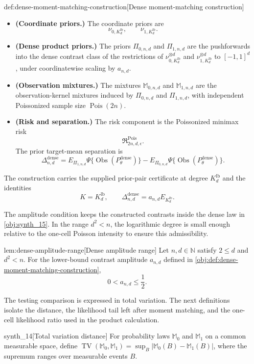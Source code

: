 \begin{definitionv}{def:dense-moment-matching-construction}[Dense moment-matching construction]
\begin{itemize}
\[
\lambda_{n,d}=\frac{2n}{d},
\qquad
a_{n,d}=\sqrt{\frac{K_d^{\mathrm{lb}}}{64\lambda_{n,d}}}.
\]
\item \textbf{(Coordinate priors.)} The coordinate priors are
\[
\nu_{0,K_d^{\mathrm{lb}}},
\qquad
\nu_{1,K_d^{\mathrm{lb}}}.
\]
\item \textbf{(Dense product priors.)} The priors \(\Pi_{0,n,d}\) and \(\Pi_{1,n,d}\) are the pushforwards into the dense contrast class of the restrictions of \(\nu_{0,K_d^{\mathrm{lb}}}^{\otimes d}\) and \(\nu_{1,K_d^{\mathrm{lb}}}^{\otimes d}\) to \([-1,1]^d\), under coordinatewise scaling by \(a_{n,d}\).
\item \textbf{(Observation mixtures.)} The mixtures \(\mathbb M_{0,n,d}\) and \(\mathbb M_{1,n,d}\) are the observation-kernel mixtures induced by \(\Pi_{0,n,d}\) and \(\Pi_{1,n,d}\), with independent Poissonized sample size \(\operatorname{Pois}(2n)\).
\item \textbf{(Risk and separation.)} The risk component is the Poissonized minimax risk
\[
\mathfrak R^{\mathrm{Pois}}_{2n,d,\epsilon}.
\]
The prior target-mean separation is
\[
\Delta_{n,d}^{\mathrm{dense}}
=
E_{\Pi_{1,n,d}}\Psi\{\operatorname{Obs}(P_\theta^{\mathrm{dense}})\}
-
E_{\Pi_{0,n,d}}\Psi\{\operatorname{Obs}(P_\theta^{\mathrm{dense}})\}.
\]
\end{itemize}
The construction carries the supplied prior-pair certificate at degree \(K_d^{\mathrm{lb}}\) and the identities
\[
K=K_d^{\mathrm{lb}},
\qquad
\Delta_{n,d}^{\mathrm{dense}}
=
a_{n,d}E_{K_d^{\mathrm{lb}}}.
\]
\end{definitionv}

The amplitude condition keeps the constructed contrasts inside the dense law in \cref{obj:synth_15}. In the range \(d^2<n\), the logarithmic degree is small enough relative to the one-cell Poisson intensity to ensure this admissibility.

\begin{lemmav}{lem:dense-amplitude-range}[Dense amplitude range]
Let \(n,d\in\mathbb N\) satisfy \(2\le d\) and \(d^2<n\). For the lower-bound contrast amplitude \(a_{n,d}\) defined in \cref{obj:def:dense-moment-matching-construction},
\[
0<a_{n,d}\le \frac12.
\]
\end{lemmav}

The testing comparison is expressed in total variation. The next definitions isolate the distance, the likelihood tail left after moment matching, and the one-cell likelihood ratio used in the product calculation.

\begin{definitionv}{synth_14}[Total variation distance]
For probability laws \(\mathbb M_0\) and \(\mathbb M_1\) on a common measurable space, define \(\operatorname{TV}(\mathbb M_0,\mathbb M_1)=\sup_{B}\lvert \mathbb M_0(B)-\mathbb M_1(B)\rvert\), where the supremum ranges over measurable events \(B\).
\end{definitionv}


